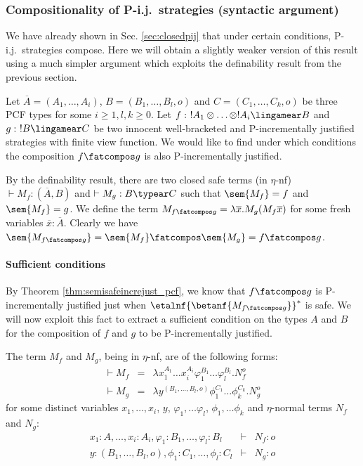 \subsubsection{Compositionality of P-i.j.\ strategies (syntactic
argument)}


We have already shown in Sec. \ref{sec:closedpij} that under certain
conditions, P-i.j.\ strategies compose. Here we will obtain a
slightly weaker version of this result using a much simpler argument
which exploits the definability result from the previous section.


 Let $\overline{A} = (A_1, \ldots, A_i)$, $B = (B_1, \ldots,
B_l,o)$ and $C=(C_1,\ldots,C_k,o)$ be three PCF types for some
$i\geq 1,l,k\geq 0$. Let $f:\ !A_1 \otimes \ldots \otimes !A_i
\lingamear B$ and $g:\ !B\lingamear C$ be two innocent
well-bracketed and P-incrementally justified strategies with finite
view function. We would like to find under which conditions the
composition $f\fatcompos g$ is also P-incrementally justified.

By the definability result, there are two closed safe terms (in $\eta$-nf) $\vdash M_f :(\overline{A},B)$  and $\vdash M_g :B \typear C$ such that $\sem{M_f} = f$
and $\sem{M_f} = g$.
We define the term $M_{f\fatcompos g} = \lambda \overline{x} . M_g (M_f \overline{x})$ for some fresh variables $\overline{x} : \overline{A}$. Clearly we have $\sem{M_{f\fatcompos g}} = \sem{M_f} \fatcompos \sem{M_g} = f\fatcompos g$.

\paragraph{Sufficient conditions}

By Theorem \ref{thm:semisafeincrejust_pcf}, we know that
$f\fatcompos g$ is P-incrementally justified just when
$\etalnf{\betanf{M_{f\fatcompos g}}}^*$ is safe. We will now exploit
this fact to extract a sufficient condition on the types $A$ and $B$
for the composition of $f$ and $g$ to be P-incrementally justified.

The term $M_f$ and $M_g$, being in $\eta$-nf, are of the following forms:
\begin{eqnarray*}
\vdash M_f &=& \lambda x_1^{A_1} \ldots x_i^{A_i} \varphi_1^{B_1} \ldots \varphi_l^{B_l} . N_f^o\\
\vdash  M_g &=& \lambda y^{ (B_1, \ldots, B_l,o)} \phi_1^{C_1} \ldots \phi_k^{C_k} . N_g^o
\end{eqnarray*}
for some distinct variables $x_1, \ldots, x_i$, $y$, $\varphi_1, \dots \varphi_l$, $\phi_1, \dots \phi_k$  and $\eta$-normal terms $N_f$ and $N_g$:
\begin{eqnarray*}
x_1:A, \ldots, x_i:A_i, \varphi_1:B_1, \dots, \varphi_l:B_l &\vdash& N_f :o \\
y: (B_1, \ldots, B_l,o), \phi_1:C_1, \dots, \phi_l:C_l &\vdash& N_g :o
\end{eqnarray*}



